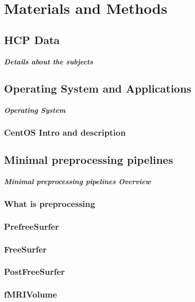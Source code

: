\chapter{Materials and Methods}

\section{HCP Data}
\paragraph{Details about the subjects}

\section{Operating System and Applications}
\paragraph{Operating System}
\subsection{CentOS Intro and description}

\section{Minimal preprocessing pipelines}
\paragraph{Minimal preprocessing pipelines Overview}
\subsection{What is preprocessing}
\subsection{PrefreeSurfer}
\subsection{FreeSurfer}
\subsection{PostFreeSurfer}
\subsection{fMRIVolume}
